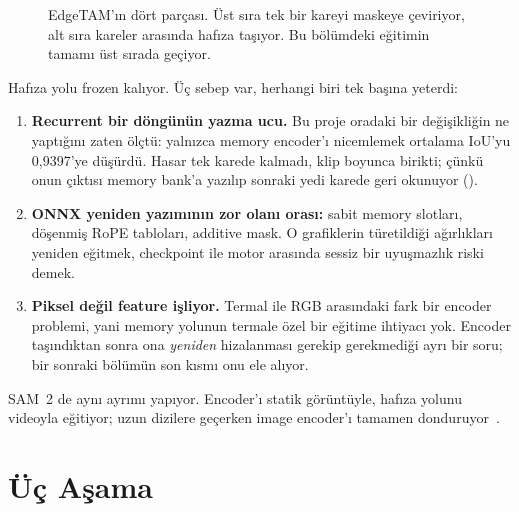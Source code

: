 \begin{figure}[H]
  \caption{EdgeTAM'ın dört parçası. Üst sıra tek bir kareyi maskeye
    çeviriyor, alt sıra kareler arasında hafıza taşıyor. Bu bölümdeki
    eğitimin tamamı üst sırada geçiyor.}
  \label{fig:egitim-dort-parca}
\end{figure}

Hafıza yolu frozen kalıyor. Üç sebep var, herhangi biri tek başına yeterdi:

\begin{enumerate}
  \item \textbf{Recurrent bir döngünün yazma ucu.} Bu proje oradaki bir
        değişikliğin ne yaptığını zaten ölçtü: yalnızca memory encoder'ı
        nicemlemek ortalama IoU'yu 0,9397'ye düşürdü. Hasar tek karede
        kalmadı, klip boyunca birikti; çünkü onun çıktısı memory bank'a
        yazılıp sonraki yedi karede geri okunuyor
        ().
  \item \textbf{ONNX yeniden yazımının zor olanı orası:} sabit memory
        slotları, döşenmiş RoPE tabloları, additive mask. O grafiklerin
        türetildiği ağırlıkları yeniden eğitmek, checkpoint ile motor
        arasında sessiz bir uyuşmazlık riski demek.
  \item \textbf{Piksel değil feature işliyor.} Termal ile RGB arasındaki
        fark bir encoder problemi, yani memory yolunun termale özel bir
        eğitime ihtiyacı yok. Encoder taşındıktan sonra ona \emph{yeniden}
        hizalanması gerekip gerekmediği ayrı bir soru; bir sonraki
        bölümün son kısmı onu ele alıyor.
\end{enumerate}

SAM~2 de aynı ayrımı yapıyor. Encoder'ı statik görüntüyle, hafıza yolunu
videoyla eğitiyor; uzun dizilere geçerken image encoder'ı tamamen
donduruyor~\cite{ravi2024sam2}.

\section{Üç Aşama}
\label{sec:egitim-uc-asama}

